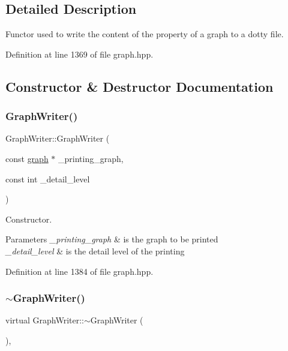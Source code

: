 \subsection{Detailed Description}
Functor used to write the content of the property of a graph to a dotty file. 

Definition at line 1369 of file graph.\+hpp.



\subsection{Constructor \& Destructor Documentation}
\mbox{\label{classGraphWriter_a52eaf829f5b8434060674e3f694308f1}} 
\subsubsection{\texorpdfstring{Graph\+Writer()}{GraphWriter()}}
{\footnotesize\ttfamily Graph\+Writer\+::\+Graph\+Writer (\begin{DoxyParamCaption}\item[{const \hyperlink{structgraph}{graph} $\ast$}]{\+\_\+printing\+\_\+graph,  }\item[{const int}]{\+\_\+detail\+\_\+level }\end{DoxyParamCaption})\hspace{0.3cm}{\ttfamily [inline]}}



Constructor. 


\begin{DoxyParams}{Parameters}
{\em \+\_\+printing\+\_\+graph} & is the graph to be printed \\
\hline
{\em \+\_\+detail\+\_\+level} & is the detail level of the printing \\
\hline
\end{DoxyParams}


Definition at line 1384 of file graph.\+hpp.

\mbox{\label{classGraphWriter_a65ec002436c260b3001cffd179da6890}} 
\subsubsection{\texorpdfstring{$\sim$\+Graph\+Writer()}{~GraphWriter()}}
{\footnotesize\ttfamily virtual Graph\+Writer\+::$\sim$\+Graph\+Writer (\begin{DoxyParamCaption}{ }\end{DoxyParamCaption})\hspace{0.3cm}{\ttfamily [inline]}, {\ttfamily [virtual]}}



